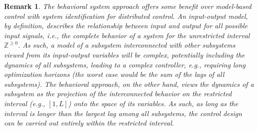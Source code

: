 \documentclass[11pt,print,draftcls,onecolumn,romanappendices]{ieeecolor}
\newtheorem{rem}{Remark}
\begin{document}
{\begin{rem} The behavioral system approach offers some benefit over model-based control with system identification for distributed control. An input-output model, by definition, describes the relationship between input and output for all possible input signals, i.e., the complete behavior of a system for the unrestricted interval $\mathbb{Z}^{\geq0}$. As such, a model of a subsystem interconnected with other subsystems viewed from its input-output variables will be complex, potentially including the dynamics of all subsystems, leading to a complex controller, e.g., requiring long optimization horizons (the worst case would be the sum of the lags of all subsystems). The behavioral approach, on the other hand, views the dynamics of a subsystem as the projection of the interconnected behavior on the restricted interval (e.g., $[1,L]$) onto the space of its variables. As such, as long as the interval is longer than the largest lag among all subsystems, the control design can be carried out entirely within the restricted interval.
\end{rem}}


\end{document}
